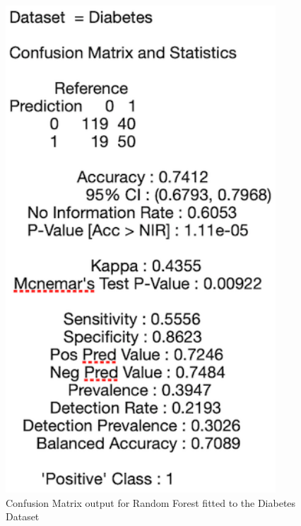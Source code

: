 \begin{figure}[!htbp]
\begin{minipage}{0.45\textwidth}
        \includegraphics[width=0.9\textwidth]{ThesisTemplate/appendix/images/Chapter5Appendix/ConfusionMatrix/Diabetes.png} 
        \caption{Confusion Matrix output for Random Forest fitted to the Diabetes Dataset}
        \label{fig:matrixDia}
    \end{minipage}
\end{figure}


